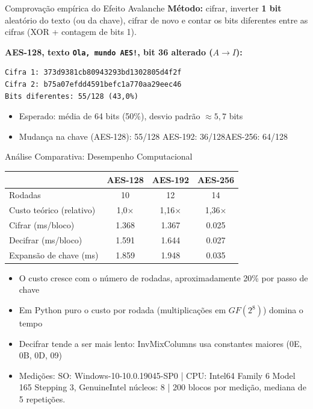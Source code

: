 \documentclass[aspectratio=169,11pt]{beamer}
\begin{document}
\begin{frame}[fragile]{Comprovação empírica do Efeito Avalanche}
  \small
  \textbf{Método:} cifrar, inverter \textbf{1 bit} aleatório do texto (ou da chave), cifrar de novo
  e contar os bits diferentes entre as cifras (XOR + contagem de bits 1).

  \vspace{0.3em}
  \textbf{AES-128, texto \texttt{Ola, mundo AES!}, bit 36 alterado ($A\rightarrow I$):}
\begin{lstlisting}[language={}]
Cifra 1: 373d9381cb80943293bd1302805d4f2f
Cifra 2: b75a07efdd4591befc1a770aa29eec46
Bits diferentes: 55/128 (43,0%)
\end{lstlisting}

  \begin{itemize}
    \item Esperado: média de 64 bits (50\%), desvio padrão $\approx 5{,}7$ bits
    \item Mudança na chave (AES-128): 55/128\quad
          AES-192: 36/128\quad AES-256: 64/128
  \end{itemize}
\end{frame}

\begin{frame}{Análise Comparativa: Desempenho Computacional}
  \small
  \begin{tabular}{lccc}
    \toprule
    & \textbf{AES-128} & \textbf{AES-192} & \textbf{AES-256}\\
    \midrule
    Rodadas & 10 & 12 & 14\\
    Custo teórico (relativo) & 1,0$\times$ & 1,16$\times$ & 1,36$\times$\\
    Cifrar (ms/bloco) & 1.368 & 1.367 & 0.025 \\
    Decifrar (ms/bloco) & 1.591 & 1.644 & 0.027\\
    Expansão de chave (ms) & 1.859 & 1.948 & 0.035 \\
    \bottomrule
  \end{tabular}

  \vspace{0.6em}
  \begin{itemize}
    \item O custo cresce com o número de rodadas, aproximadamente 20\% por passo de chave
    \item Em Python puro o custo por rodada (multiplicações em $GF(2^8)$) domina o tempo
    \item Decifrar tende a ser mais lento: InvMixColumns usa constantes maiores (0E, 0B, 0D, 09)
    \item Medições: SO: Windows-10-10.0.19045-SP0 | CPU: Intel64 Family 6 Model 165 Stepping 3, GenuineIntel núcleos: 8 | 200 blocos por medição, mediana de 5 repetições.
  \end{itemize}
\end{frame}
\end{document}
